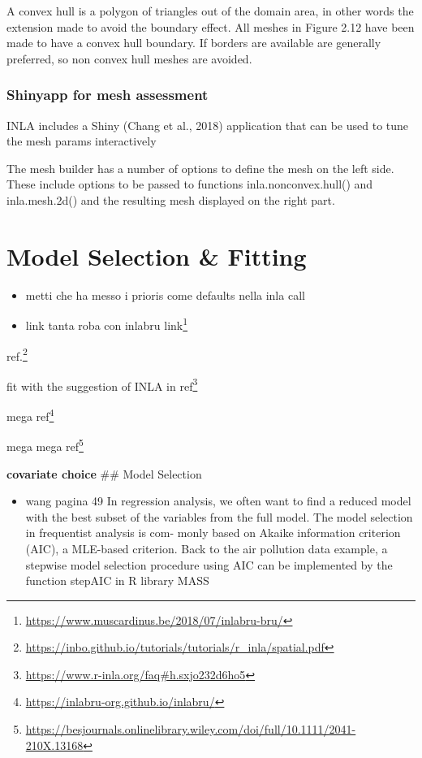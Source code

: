 \documentclass[
  12pt,
  a4paper,
  oneside]{book}
\DeclareRobustCommand{\href}[2]{#2\footnote{\url{#1}}}
\providecommand{\tightlist}{%
  \setlength{\itemsep}{0pt}\setlength{\parskip}{0pt}}
\theoremstyle{definition}
\theoremstyle{definition}
\theoremstyle{definition}
\theoremstyle{remark}
\begin{document}
A convex hull is a polygon of triangles out of the domain area, in other words the extension made to avoid the boundary effect. All meshes in Figure 2.12 have been made to have a convex hull boundary. If borders are available are generally preferred, so non convex hull meshes are avoided.

\hypertarget{shinyapp-for-mesh-assessment}{%
\subsection{Shinyapp for mesh assessment}\label{shinyapp-for-mesh-assessment}}

INLA includes a Shiny (Chang et al., 2018) application that can be used to tune the mesh params interactively

The mesh builder has a number of options to define the mesh on the left side. These include options to be passed to functions inla.nonconvex.hull() and inla.mesh.2d() and the resulting mesh displayed on the right part.

\hypertarget{modelspec}{%
\chapter{Model Selection \& Fitting}\label{modelspec}}

\begin{itemize}
\item
  metti \citet{Ling} che ha messo i prioris come defaults nella inla call
\item
  link tanta roba con inlabru \href{https://www.muscardinus.be/2018/07/inlabru-bru/}{link}
\end{itemize}

\href{https://inbo.github.io/tutorials/tutorials/r_inla/spatial.pdf}{ref.}

fit with the suggestion of INLA in \href{https://www.r-inla.org/faq\#h.sxjo232d6ho5}{ref}

\href{https://inlabru-org.github.io/inlabru/}{mega ref}

\href{https://besjournals.onlinelibrary.wiley.com/doi/full/10.1111/2041-210X.13168}{mega mega ref}

\textbf{covariate choice }
\#\# Model Selection

\begin{itemize}
\tightlist
\item
  wang pagina 49
  In regression analysis, we often want to find a reduced model with the best subset of
  the variables from the full model. The model selection in frequentist analysis is com-
  monly based on Akaike information criterion (AIC), a MLE-based criterion. Back to
  the air pollution data example, a stepwise model selection procedure using AIC can
  be implemented by the function stepAIC in R library MASS
\end{itemize}
\end{document}
